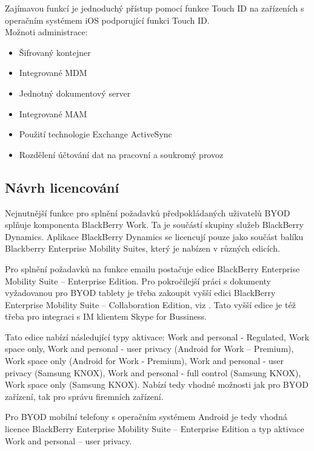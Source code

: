 Zajímavou funkcí je jednoduchý přístup pomocí funkce Touch ID na zařízeních s operačním systémem iOS podporující funkci Touch ID.\\

Možnoti administrace:
\begin{itemize}
   \item Šifrovaný kontejner
   \item Integrované MDM
   \item Jednotný dokumentový server
   \item Integrované MAM
   \item Použití technologie Exchange ActiveSync
   \item Rozdělení účtování dat na pracovní a soukromý provoz
\end{itemize}

\subsection{Návrh licencování}

Nejnutnější funkce pro splnění požadavků předpokládaných uživatelů BYOD splňuje komponenta BlackBerry Work. Ta je součástí skupiny služeb BlackBerry Dynamics. Aplikace BlackBerry Dynamics se licencují pouze jako součást balíku Blackberry Enterprise Mobility Suites, který je nabízen v různých edicích.

Pro splnění požadavků na funkce emailu postačuje edice BlackBerry Enterprise Mobility Suite --  Enterprise Edition. Pro pokročilejší práci s dokumenty vyžadovanou pro BYOD tablety je třeba zakoupit vyšší edici BlackBerry Enterprise Mobility Suite -- Collaboration Edition, viz \cite{BBEMS}.%
 Tato vyšší edice je též třeba pro integraci s IM klientem Skype for Bussiness.

Tato edice nabízí následující typy aktivace: Work and personal - Regulated, Work space only, Work and personal - user privacy (Android for Work -- Premium), Work space only (Android for Work - Premium), Work and personal - user privacy (Samsung KNOX), Work and personal - full control (Samsung KNOX), Work space only (Samsung KNOX). Nabízí tedy vhodné možnosti jak pro BYOD zařízení, tak pro správu firemních zařízení. 

Pro BYOD mobilní telefony s operačním systémem Android je tedy vhodná licence BlackBerry Enterprise Mobility Suite -- Enterprise Edition a typ aktivace Work and personal -- user privacy.


